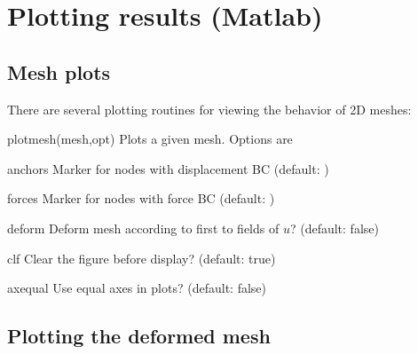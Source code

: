 \newpage
\section{Plotting results (Matlab)}
\subsection{Mesh plots}
There are several plotting routines for viewing the behavior of 2D
meshes:
\begin{codelist}

  \item[plotmesh(mesh,opt)]  Plots a given mesh.  Options are
    \begin{codelist}
      \item[anchors]  Marker for nodes with displacement BC
        (default: )
      \item[forces]   Marker for nodes with force BC
        (default: )
      \item[deform]   Deform mesh according to first to fields of $u$?
        (default: false)
      \item[clf]      Clear the figure before display?
        (default: true)
      \item[axequal]  Use equal axes in plots? (default: false)
    \end{codelist}

\end{codelist}


\subsection{Plotting the deformed mesh}

